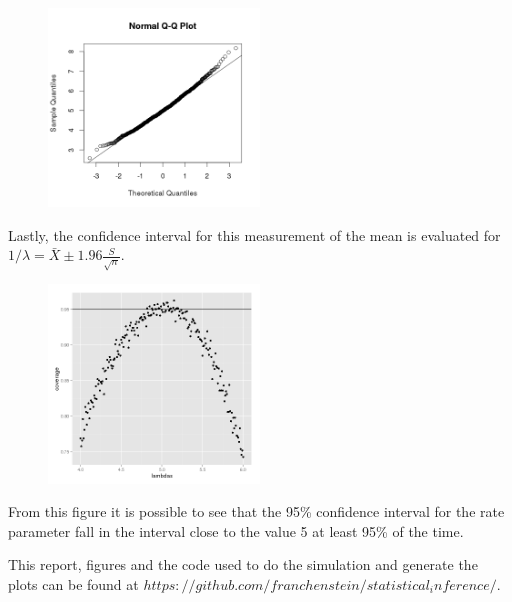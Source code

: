 \documentclass[a4paper]{article}
\begin{document}
\begin{figure}[h!]
\centering
\includegraphics[width = 0.5\textwidth]{qqplot_part_1.png}
\end{figure}

Lastly, the confidence interval for this measurement of the mean is evaluated for $1/\lambda = \bar{X} \pm 1.96\frac{S}{\sqrt{n}}$.

\begin{figure}[h!]
\centering
\includegraphics[width = 0.5\textwidth]{confidence_part_1.png}
\end{figure}

From this figure it is possible to see that the 95\% confidence interval for the rate parameter fall in the interval close to the value 5 at least 95\% of the time.

This report, figures and the code used to do the simulation and generate the plots can be found at $https://github.com/franchenstein/statistical_inference/$.
\end{document}
